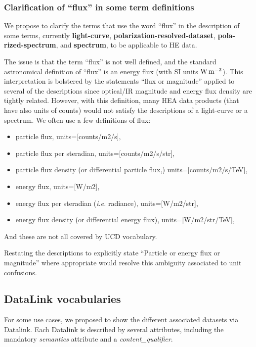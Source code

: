 \documentclass[11pt,a4paper]{ivoa}
\begin{document}


\subsubsection{Clarification of ``flux'' in some term definitions}

We propose to clarify the terms that use the word ``flux'' in the description of some terms, currently {\bf light-curve}, {\bf polarization-resolved-dataset}, {\bf pola-\\rized-spectrum}, and {\bf spectrum}, to be applicable to \gls{HE} data.

The issue is that the term ``flux'' is not well defined, and the standard astronomical definition of ``flux''
is an energy flux (with SI units $\rm W\,m^{-2}$).  This interpretation is bolstered by the statements ``flux or magnitude'' applied to several of the descriptions since optical/IR magnitude and energy flux density are tightly related.  However, with this definition, many \gls{HEA} data products (that have also units of counts) would not satisfy the descriptions of a light-curve or a spectrum. We often use a few definitions of flux:
\begin{itemize}
  \item particle flux, units=[counts/m2/s],
  \item particle flux per steradian, units=[counts/m2/s/str],
  \item particle flux density (or differential particle flux,) units=[counts/m2/s/TeV],
  \item energy flux, units=[W/m2],
  \item energy flux per steradian ({\em i.e.\/} radiance), units=[W/m2/str],
  \item energy flux density (or differential energy flux), units=[W/m2/str/TeV],
\end{itemize}
And these are not all covered by UCD vocabulary.

Restating the descriptions to explicitly state ``Particle or energy flux or magnitude'' where appropriate would resolve this ambiguity associated to unit confusions.


\subsection{DataLink vocabularies}\label{sec:DLs}

For some use cases, we proposed to show the different associated datasets via Datalink. Each Datalink is described by several attributes, including the mandatory {\em semantics} attribute and a {\em content\_qualifier}.
\end{document}
